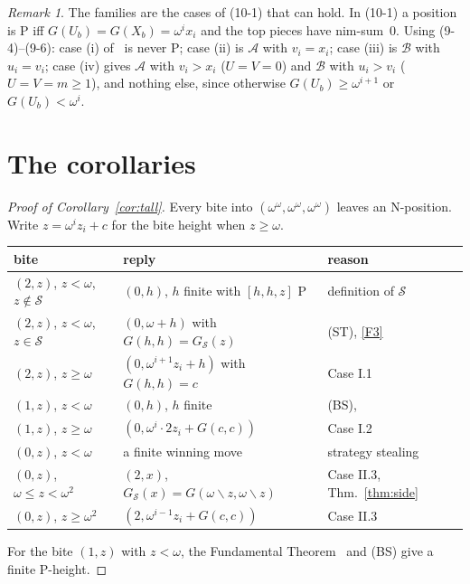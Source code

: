\documentclass[11pt]{amsart}
\theoremstyle{definition}
\theoremstyle{remark}
\newtheorem{remark}[theorem]{Remark}
\newcommand{\Sc}{\mathcal{S}}
\newcommand{\A}{\mathcal{A}}
\newcommand{\B}{\mathcal{B}}
\newcommand{\G}{G}
\newcommand{\GS}{G_{\Sc}}
\newcommand{\ldiv}{\mathbin{\backslash}}
\begin{document}
\begin{remark}\label{rem:101}
The families are the cases of (10-1) that can hold. In (10-1) a position is P iff
$\G(U_b)=\G(X_b)=\omega^ix_i$ and the top pieces have nim-sum~0. Using (9-4)--(9-6): case (i)
of~\cite{HS} is never P; case (ii) is $\A$ with $v_i=x_i$; case (iii) is $\B$ with $u_i=v_i$;
case (iv) gives $\A$ with $v_i>x_i$ ($U=V=0$) and $\B$ with $u_i>v_i$ ($U=V=m\ge1$), and nothing
else, since otherwise $\G(U_b)\ge\omega^{i+1}$ or $\G(U_b)<\omega^i$.
\end{remark}

\section{The corollaries}

\begin{proof}[Proof of Corollary~\ref{cor:tall}]
Every bite into $(\omega^\omega,\omega^\omega,\omega^\omega)$ leaves an N-position. Write
$z=\omega^iz_i+c$ for the bite height when $z\ge\omega$.
\begin{center}
\begin{tabular}{lll}
bite & reply & reason\\\hline
$(2,z)$, $z<\omega$, $z\notin\Sc$ & $(0,h)$, $h$ finite with $[h,h,z]$ P & definition of $\Sc$\\
$(2,z)$, $z<\omega$, $z\in\Sc$ & $(0,\omega+h)$ with $\G(h,h)=\GS(z)$ & (ST), \ref{F3}\\
$(2,z)$, $z\ge\omega$ & $(0,\omega^{i+1}z_i+h)$ with $\G(h,h)=c$ & Case I.1\\
$(1,z)$, $z<\omega$ & $(0,h)$, $h$ finite & (BS), \cite[Thm.~5.1]{HS}\\
$(1,z)$, $z\ge\omega$ & $(0,\omega^i\cdot2z_i+\G(c,c))$ & Case I.2\\
$(0,z)$, $z<\omega$ & a finite winning move & strategy stealing\\
$(0,z)$, $\omega\le z<\omega^2$ & $(2,x)$, $\GS(x)=\G(\omega\ldiv z,\omega\ldiv z)$ & Case II.3, Thm.~\ref{thm:side}\\
$(0,z)$, $z\ge\omega^2$ & $(2,\omega^{i-1}z_i+\G(c,c))$ & Case II.3
\end{tabular}
\end{center}
For the bite $(1,z)$ with $z<\omega$, the Fundamental Theorem~\cite[Thm.~5.1]{HS} and (BS)
give a finite P-height.
\end{proof}
\end{document}
